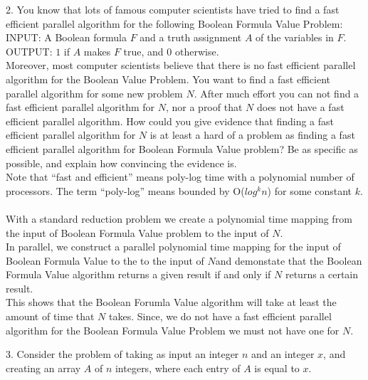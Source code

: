 \documentclass[10pt]{article}
\begin{document}
2. You know that lots of famous computer scientists have tried to find a fast efficient parallel algorithm
for the following Boolean Formula Value Problem:\\
INPUT: A Boolean formula $F$ and a truth assignment $A$ of the variables in $F$.\\
OUTPUT: $1$ if $A$ makes $F$ true, and $0$ otherwise.\\
Moreover, most computer scientists believe that there is no fast efficient parallel algorithm for the
Boolean Value Problem. You want to find a fast efficient parallel algorithm for some new problem $N$.
After much effort you can not find a fast efficient parallel algorithm for $N$, nor a proof that $N$ does
not have a fast efficient parallel algorithm. How could you give evidence that finding a fast efficient
parallel algorithm for $N$ is at least a hard of a problem as finding a fast efficient parallel algorithm for
Boolean Formula Value problem? Be as specific as possible, and explain how convincing the evidence
is.\\
Note that ``fast and efficient'' means poly-log time with a polynomial number of processors. The term
``poly-log'' means bounded by O($log^kn$) for some constant $k$.\\
\\
With a standard reduction problem we create a polynomial time mapping from the input of Boolean Formula Value
problem to the input of $N$.\\
In parallel, we construct a parallel polynomial time mapping for the input of Boolean Formula Value to the
to the input of  $N$and demonstate that the Boolean Formula Value algorithm
returns a given result if and only if $N$ returns a certain result.\\
This shows that the Boolean Forumla Value algorithm will take at least the amount of time that $N$
takes. Since, we do not have a fast efficient parallel algorithm
for the Boolean Formula Value Problem we must not have one for $N$.
\newpage

3. Consider the problem of taking as input an integer $n$ and an integer $x$, and creating an array $A$ of $n$
integers, where each entry of $A$ is equal to $x$.\\
\end{document}
